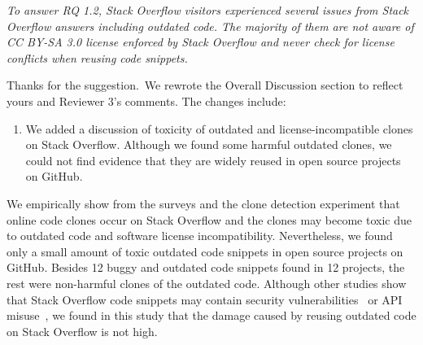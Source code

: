 \documentclass[a4paper,twoside,10pt]{reviewresponse}
\begin{document}
\textit{To answer RQ 1.2, Stack Overflow visitors experienced several issues from Stack
Overflow answers including outdated code. The majority of them are not aware of
CC BY-SA 3.0 license enforced by Stack Overflow and never check for license
conflicts when reusing code snippets.}


Thanks for the suggestion.~We rewrote the Overall Discussion section to reflect yours and Reviewer 3's comments. The changes include:

\begin{enumerate}
	\item We added a discussion of toxicity of outdated and license-incompatible clones on Stack Overflow. Although we found some harmful outdated clones, we could not find evidence that they are widely reused in open source projects on GitHub.
\end{enumerate} 

We empirically show from the surveys and the clone detection experiment that online code clones occur on Stack Overflow and the clones may become toxic due to outdated code and software license incompatibility. 
Nevertheless, we found only a small amount of toxic outdated code snippets in open source projects on GitHub. Besides 12 buggy and outdated code snippets found in 12 projects, the rest were non-harmful clones of the outdated code. Although other studies show that Stack Overflow code snippets may contain security vulnerabilities~\citep{Acar2016,Fischer2017} or API misuse~\citep{Zhang2018}, we found in this study that the damage caused by reusing outdated code on Stack Overflow is not high. 
\end{document}
